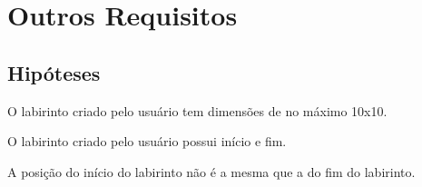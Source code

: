 \chapter{Outros Requisitos}

\section{Hipóteses}
O labirinto criado pelo usuário tem dimensões de no máximo 10x10.

O labirinto criado pelo usuário possui início e fim.

A posição do início do labirinto não é a mesma que a do fim do labirinto.




